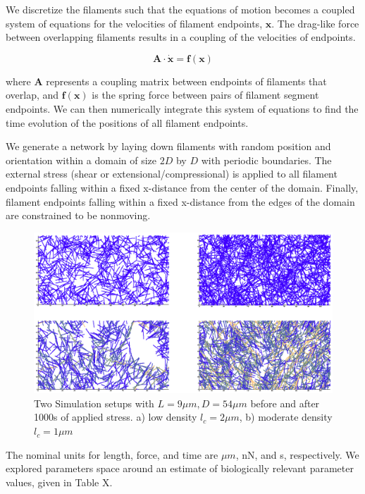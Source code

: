 \documentclass[pre,preprint]{revtex4-1}
\begin{document}
We discretize the filaments such that the equations of motion becomes a coupled system of equations for the velocities of filament endpoints, $\mathbf{x}$.  The drag-like force between overlapping filaments results in a coupling of the velocities of endpoints.  

\begin{equation}
\mathbf{A \cdot \dot x} = \mathbf{f(x)}
\end{equation}

where $\mathbf{A }$ represents a coupling matrix between endpoints of filaments that overlap, and $\mathbf{f(x)}$ is the spring force between pairs of filament segment endpoints.  We can then numerically integrate this system of equations to find the time evolution of the positions of all filament endpoints.

We generate a network by laying down filaments with random position and orientation within a domain of size $2D$ by $D$ with periodic boundaries.  The external stress (shear or extensional/compressional) is applied to all filament endpoints falling within a fixed x-distance from the center of the domain.  Finally, filament endpoints falling within a fixed x-distance from the edges of the domain are constrained to be nonmoving.

\begin{figure}[h!]
\centering
\includegraphics[width=\hsize]{network_def}
\caption{\label{fig:sim}Two Simulation setups with $L=9 \mu m, D = 54 \mu m$ before and after 1000s of applied stress. a) low density $l_c=2 \mu m$, b) moderate density $l_c=1 \mu m$ }
\end{figure}

The nominal units for length, force, and time are $\mu m$, nN, and s, respectively.  We explored parameters space around an estimate of biologically relevant parameter values, given in Table X. 
\end{document}
